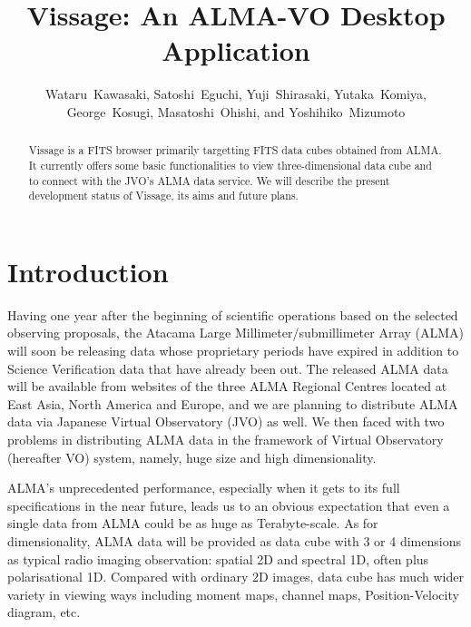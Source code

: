 
\resetcounters




\title{Vissage: An ALMA-VO Desktop Application}
\author{Wataru~Kawasaki, Satoshi~Eguchi, Yuji~Shirasaki, Yutaka~Komiya, George~Kosugi, Masatoshi~Ohishi, 
and Yoshihiko~Mizumoto
}


\begin{abstract}
Vissage is a FITS browser primarily targetting FITS data cubes obtained from 
ALMA. It currently offers some basic functionalities to view three-dimensional 
data cube and to connect with the JVO's ALMA data service. We will describe the 
present development status of Vissage, its aims and future plans.
\end{abstract}

\section{Introduction}
Having one year after the beginning of scientific operations based on the 
selected observing proposals, the Atacama Large Millimeter/submillimeter Array 
(ALMA) will soon be releasing data whose proprietary periods have expired in 
addition to Science Verification data that have already been out. 
The released ALMA data will be available from websites of the three ALMA 
Regional Centres located at East Asia, North America and Europe, and we are 
planning to distribute ALMA data via Japanese Virtual Observatory (JVO) as well. 
We then faced with two problems in distributing ALMA data in the framework of 
Virtual Observatory (hereafter VO) system, namely, huge size and high 
dimensionality. 

ALMA's unprecedented performance, especially when it gets to its full 
specifications in the near future, leads us to an obvious expectation that even 
a single data from ALMA could be as huge as Terabyte-scale. 
As for dimensionality, ALMA data will be provided as data cube with 3 or 4 
dimensions as typical radio imaging observation: spatial 2D and spectral 
1D, often plus polarisational 1D. Compared with ordinary 2D images, data cube 
has much wider variety in viewing ways including moment maps, channel maps, 
Position-Velocity diagram, etc. 

